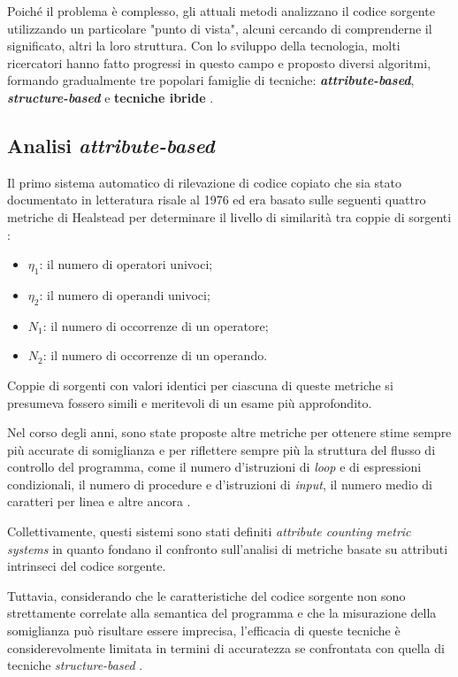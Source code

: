 Poiché il problema è complesso, gli attuali metodi analizzano il codice sorgente utilizzando un particolare "punto di vista", alcuni cercando di comprenderne il significato, altri la loro struttura.
%
Con lo sviluppo della tecnologia, molti ricercatori hanno fatto progressi in questo campo e proposto diversi algoritmi, formando gradualmente tre popolari famiglie di tecniche: \textbf{\textit{attribute-based}}, \textbf{\textit{structure-based}} e \textbf{tecniche ibride} \cite{es-plag}.

\subsection{Analisi \textit{attribute-based}}
Il primo sistema automatico di rilevazione di codice copiato che sia stato documentato in letteratura risale al 1976 \cite{ottenstein} ed era basato sulle seguenti quattro metriche di Healstead per determinare il livello di similarità tra coppie di sorgenti \cite{halstead}:

\begin{itemize}
    \item $\eta_1$: il numero di operatori univoci;
    \item $\eta_2$: il numero di operandi univoci;
    \item $N_1$: il numero di occorrenze di un operatore;
    \item $N_2$: il numero di occorrenze di un operando.
\end{itemize}

Coppie di sorgenti con valori identici per ciascuna di queste metriche si presumeva fossero simili e meritevoli di un esame più approfondito.

Nel corso degli anni, sono state proposte altre metriche per ottenere stime sempre più accurate di somiglianza e per riflettere sempre più la struttura del flusso di controllo del programma, come il numero d'istruzioni di \textit{loop} e di espressioni condizionali, il numero di procedure e d'istruzioni di \textit{input}, il numero medio di caratteri per linea e altre ancora \cite{pdectet}.

Collettivamente, questi sistemi sono stati definiti \textit{attribute counting metric systems} in quanto fondano il confronto sull'analisi di metriche basate su attributi intrinseci del codice sorgente.

Tuttavia, considerando che le caratteristiche del codice sorgente non sono strettamente correlate alla semantica del programma e che la misurazione della somiglianza può risultare essere imprecisa, l'efficacia di queste tecniche è considerevolmente limitata in termini di accuratezza se confrontata con quella di tecniche \textit{structure-based} \cite{es-plag}.

